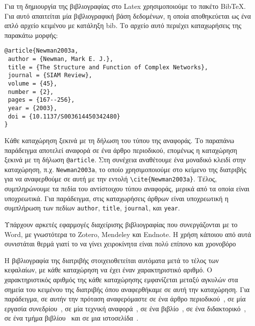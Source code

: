 Για τη δημιουργία της βιβλιογραφίας στο Latex χρησιμοποιούμε το πακέτο BibTeX.
Για αυτό απαιτείται μία βιβλιογραφική βάση δεδομένων, η οποία αποθηκεύεται ως 
ένα απλό αρχείο κειμένου με κατάληξη bib.
Το αρχείο αυτό περιέχει καταχωρήσεις της παρακάτω μορφής:

\begin{verbatim}
@article{Newman2003a,
 author = {Newman, Mark E. J.},
 title = {The Structure and Function of Complex Networks},
 journal = {SIAM Review},
 volume = {45},
 number = {2},
 pages = {167--256},
 year = {2003},
 doi = {10.1137/S003614450342480}
}
\end{verbatim}

Κάθε καταχώρηση ξεκινά με τη δήλωση του τύπου της αναφοράς. Το παραπάνω 
παράδειγμα αποτελεί αναφορά σε ένα άρθρο περιοδικού, επομένως η καταχώρηση 
ξεκινά με τη δήλωση \verb|@article|. Στη συνέχεια αναθέτουμε ένα μοναδικό 
κλειδί στην καταχώρηση, π.χ. \verb|Newman2003a|, το οποίο χρησιμοποιούμε 
στο κείμενο της διατριβής για να αναφερθούμε σε αυτή με την εντολή 
\verb|\cite{Newman2003a}|. Τέλος, συμπληρώνουμε τα πεδία του αντίστοιχου 
τύπου αναφοράς, μερικά από τα οποία είναι υποχρεωτικά. Για παράδειγμα, στις 
καταχωρήσεις άρθρων είναι υποχρεωτική η συμπλήρωση των πεδίων \verb|author|, 
\verb|title|, \verb|journal|, και \verb|year|.

Υπάρχουν αρκετές εφαρμογές διαχείρισης βιβλιογραφίας που συνεργάζονται με το Word, με γνωστότερα το Zotero, Mendeley και Endnote.
Η χρήση κάποιου από αυτά συνιστάται θερμά γιατί το να γίνει χειροκίνητα είναι πολύ επίπονο και χρονοβόρο

Η βιβλιογραφία της διατριβής στοιχειοθετείται αυτόματα μετά το τέλος των 
κεφαλαίων, με κάθε καταχώρηση να έχει έναν χαρακτηριστικό αριθμό.
Ο χαρακτηριστικός αριθμός της κάθε καταχώρησης εμφανίζεται μεταξύ αγκυλών 
στα σημεία του κειμένου της διατριβής όπου αναφερθήκαμε σε αυτή την καταχώρηση.
Για παράδειγμα, σε αυτήν την πρόταση αναφερόμαστε σε ένα άρθρο 
περιοδικού~\cite{Newman2003a}, σε μία εργασία συνεδρίου~\cite{DeCandia2007a}, 
σε μία τεχνική αναφορά~\cite{Jain1984a}, σε ένα βιβλίο~\cite{Golumbic2004a}, σε ένα διδακτορικό~\cite{beckmann_managing_2006}, σε ένα τμήμα βιβλίου~\cite{lai_efficient_2004} και σε μια ιστοσελίδα~\cite{rubino_ie9_nodate}.


